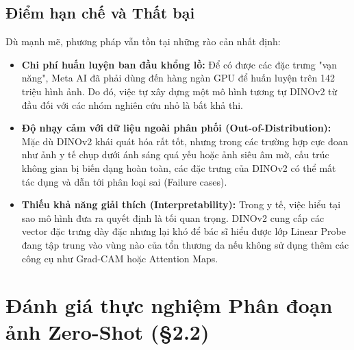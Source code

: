 \subsection{Điểm hạn chế và Thất bại}
Dù mạnh mẽ, phương pháp vẫn tồn tại những rào cản nhất định:
\begin{itemize}
    \item \textbf{Chi phí huấn luyện ban đầu khổng lồ:} Để có được các đặc trưng "vạn năng", Meta AI đã phải dùng đến hàng ngàn GPU để huấn luyện trên 142 triệu hình ảnh. Do đó, việc tự xây dựng một mô hình tương tự DINOv2 từ đầu đối với các nhóm nghiên cứu nhỏ là bất khả thi.
    \item \textbf{Độ nhạy cảm với dữ liệu ngoài phân phối (Out-of-Distribution):} Mặc dù DINOv2 khái quát hóa rất tốt, nhưng trong các trường hợp cực đoan như ảnh y tế chụp dưới ánh sáng quá yếu hoặc ảnh siêu âm mờ, cấu trúc không gian bị biến dạng hoàn toàn, các đặc trưng của DINOv2 có thể mất tác dụng và dẫn tới phân loại sai (Failure cases).
    \item \textbf{Thiếu khả năng giải thích (Interpretability):} Trong y tế, việc hiểu tại sao mô hình đưa ra quyết định là tối quan trọng. DINOv2 cung cấp các vector đặc trưng dày đặc nhưng lại khó để bác sĩ hiểu được lớp Linear Probe đang tập trung vào vùng nào của tổn thương da nếu không sử dụng thêm các công cụ như Grad-CAM hoặc Attention Maps.
\end{itemize}

\section{Đánh giá thực nghiệm Phân đoạn ảnh Zero-Shot (§2.2)}

